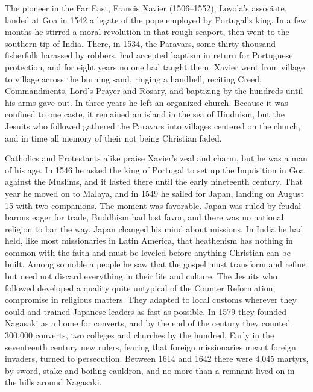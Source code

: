 The pioneer in the Far East, Francis Xavier (1506--1552), Loyola's associate, landed at Goa in 1542
a legate of the pope employed by Portugal's king. In a few months he stirred a moral revolution
in that rough seaport, then went to the southern tip of India. There, in 1534, the Paravars, some
thirty thousand fisherfolk harassed by robbers, had accepted baptism in return for Portuguese
protection, and for eight years no one had taught them. Xavier went from village to village across
the burning sand, ringing a handbell, reciting Creed, Commandments, Lord's Prayer and Rosary, and baptizing by the hundreds until his arms gave out. In three years he left an
organized church. Because it was confined to one caste, it remained an island in the sea of Hinduism,
but the Jesuits who followed gathered the Paravars into villages centered on the church, and in time
all memory of their not being Christian faded.

Catholics and Protestants alike praise Xavier's zeal and charm, but he was a man of his age. In 1546
he asked the king of Portugal to set up the Inquisition in Goa against the Muslims, and it lasted
there until the early nineteenth century. That year he moved on to Malaya, and in 1549 he sailed for
Japan, landing on August 15 with two companions. The moment was favorable. Japan was ruled by feudal
barons eager for trade, Buddhism had lost favor, and there was no national religion to bar the way. Japan
changed his mind about missions. In India he had held, like most missionaries in Latin America, that
heathenism has nothing in common with the faith and must be leveled before anything Christian can be
built. Among so noble a people he saw that the gospel must transform and refine
but need not discard everything in their life and culture. The Jesuits who followed developed a
quality quite untypical of the Counter Reformation, compromise in religious matters. They adapted to
local customs wherever they could and trained Japanese leaders as fast as possible. In 1579 they
founded Nagasaki as a home for converts, and by the end of the century they counted 300,000 converts, two colleges and churches by the hundred. Early in the seventeenth century new
rulers, fearing that foreign missionaries meant foreign invaders, turned to persecution. Between 1614
and 1642 there were 4,045 martyrs, by sword, stake and boiling cauldron, and no more than a remnant lived on in the hills around Nagasaki.

